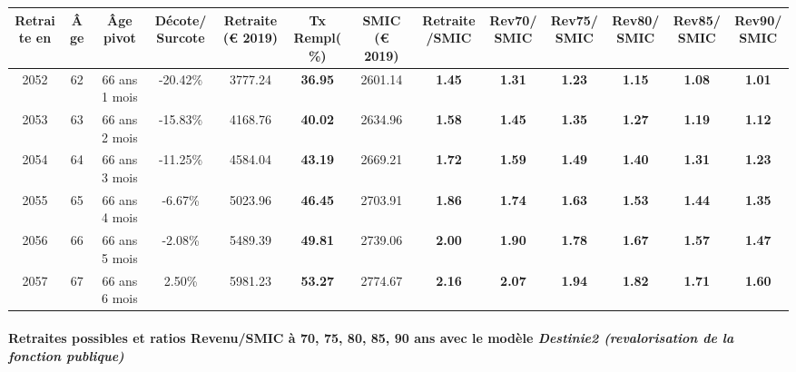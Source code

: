 { \scriptsize \begin{center} 
\begin{tabular}[htb]{|c|c||c|c||c|c||c||c|c|c|c|c|c|} 
\hline 
 Retraite en &  Âge &  Âge pivot &  Décote/Surcote &  Retraite (\euro{} 2019) &  Tx Rempl(\%) &  SMIC (\euro{} 2019) &  Retraite/SMIC &  Rev70/SMIC &  Rev75/SMIC &  Rev80/SMIC &  Rev85/SMIC &  Rev90/SMIC \\ 
\hline \hline 
 2052 &  62 &  66 ans 1 mois &  -20.42\% &  3777.24 &  {\bf 36.95} &  2601.14 &  {\bf 1.45} &  {\bf 1.31} &  {\bf 1.23} &  {\bf 1.15} &  {\bf 1.08} &  {\bf 1.01} \\ 
\hline 
 2053 &  63 &  66 ans 2 mois &  -15.83\% &  4168.76 &  {\bf 40.02} &  2634.96 &  {\bf 1.58} &  {\bf 1.45} &  {\bf 1.35} &  {\bf 1.27} &  {\bf 1.19} &  {\bf 1.12} \\ 
\hline 
 2054 &  64 &  66 ans 3 mois &  -11.25\% &  4584.04 &  {\bf 43.19} &  2669.21 &  {\bf 1.72} &  {\bf 1.59} &  {\bf 1.49} &  {\bf 1.40} &  {\bf 1.31} &  {\bf 1.23} \\ 
\hline 
 2055 &  65 &  66 ans 4 mois &  -6.67\% &  5023.96 &  {\bf 46.45} &  2703.91 &  {\bf 1.86} &  {\bf 1.74} &  {\bf 1.63} &  {\bf 1.53} &  {\bf 1.44} &  {\bf 1.35} \\ 
\hline 
 2056 &  66 &  66 ans 5 mois &  -2.08\% &  5489.39 &  {\bf 49.81} &  2739.06 &  {\bf 2.00} &  {\bf 1.90} &  {\bf 1.78} &  {\bf 1.67} &  {\bf 1.57} &  {\bf 1.47} \\ 
\hline 
 2057 &  67 &  66 ans 6 mois &  2.50\% &  5981.23 &  {\bf 53.27} &  2774.67 &  {\bf 2.16} &  {\bf 2.07} &  {\bf 1.94} &  {\bf 1.82} &  {\bf 1.71} &  {\bf 1.60} \\ 
\hline 
\hline 
\end{tabular} 
\end{center} } 
\paragraph{Retraites possibles et ratios Revenu/SMIC à 70, 75, 80, 85, 90 ans avec le modèle \emph{Destinie2 (revalorisation de la fonction publique)}}  
 
